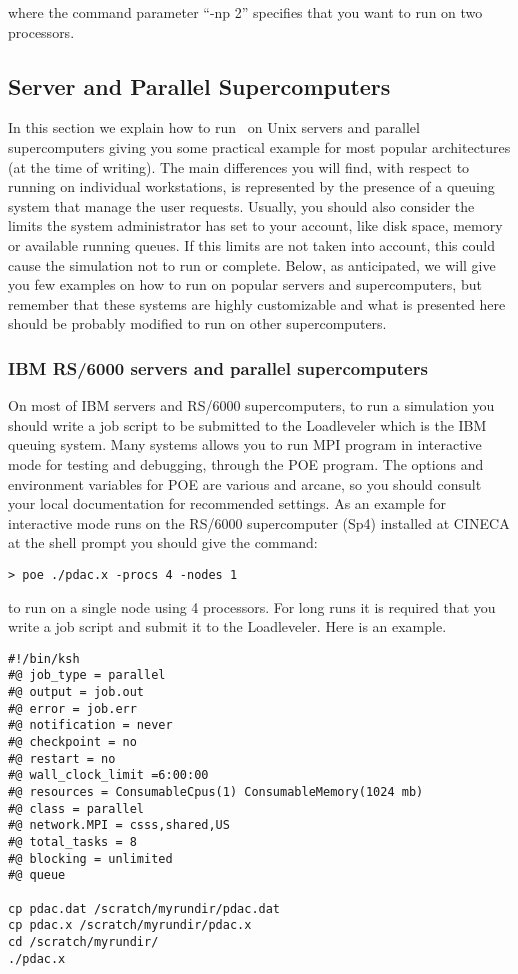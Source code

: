 where the command parameter ``-np 2'' specifies that you want
to run on two processors.

\subsection{Server and Parallel Supercomputers}

In this section we explain how to run \PDAC\ on Unix servers
and parallel supercomputers giving you some practical example
for most popular architectures (at the time of writing).
The main differences you will find, with respect to running on 
individual workstations,
is represented by the presence of a queuing system that
manage the user requests. Usually, you should also 
consider the limits the system administrator has set to your account,
like disk space, memory or available running queues. 
If this limits are not taken into account, this could cause
the simulation not to run or complete.
Below, as anticipated, we will give you few examples on how to run
on popular servers and supercomputers, but remember that 
these systems are highly customizable and what is presented here
should be probably modified to run on other supercomputers.

\subsubsection{IBM RS/6000 servers and parallel supercomputers}

On most of IBM servers and RS/6000 supercomputers, to run a simulation you
should write a job script to be submitted to the Loadleveler which
is the IBM queuing system.
Many systems allows you to run MPI program in interactive mode for
testing and debugging, through the POE program.  
The options and environment variables for POE are various and arcane, 
so you should consult your local documentation for recommended settings.  
As an example for interactive mode runs on the RS/6000 supercomputer
(Sp4) installed at CINECA at the shell prompt you should give the
command:

\begin{verbatim}
> poe ./pdac.x -procs 4 -nodes 1 
\end{verbatim}

to run on a single node using 4 processors.
For long runs it is required that you write a job script
and submit it to the Loadleveler. Here is an example.

\begin{verbatim}
#!/bin/ksh
#@ job_type = parallel
#@ output = job.out
#@ error = job.err
#@ notification = never
#@ checkpoint = no
#@ restart = no
#@ wall_clock_limit =6:00:00
#@ resources = ConsumableCpus(1) ConsumableMemory(1024 mb)
#@ class = parallel
#@ network.MPI = csss,shared,US
#@ total_tasks = 8
#@ blocking = unlimited
#@ queue

cp pdac.dat /scratch/myrundir/pdac.dat
cp pdac.x /scratch/myrundir/pdac.x
cd /scratch/myrundir/
./pdac.x
\end{verbatim}

